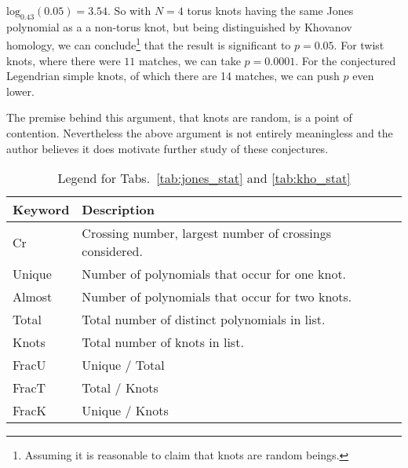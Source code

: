     $\textrm{log}_{0.43}(0.05)=3.54$. So with $N=4$ torus knots having the
    same Jones polynomial as a a non-torus knot, but being distinguished by
    Khovanov homology, we can conclude\footnote{%
        Assuming it is reasonable to claim that knots are random beings.
    }
    that the result is significant to $p=0.05$. For twist knots, where there
    were $11$ matches, we can take $p=0.0001$. For the conjectured Legendrian
    simple knots, of which there are 14 matches, we can push $p$ even lower.
    \par\hfill\par
    The premise behind this argument, that knots are random, is a point of
    contention. Nevertheless the above argument is not entirely meaningless
    and the author believes it does motivate further study of these conjectures.
    \begin{table}
        \centering
        \begin{tabular}{| l | l |}
            \hline
            Keyword & Description\\
            \hline
            Cr     & Crossing number, largest number of crossings considered.\\
            Unique & Number of polynomials that occur for one knot.\\
            Almost & Number of polynomials that occur for two knots.\\
            Total  & Total number of distinct polynomials in list.\\
            Knots  & Total number of knots in list.\\
            FracU  & Unique / Total\\
            FracT  & Total / Knots\\
            FracK  & Unique / Knots\\
            \hline
        \end{tabular}
        \caption{Legend for Tabs.~\ref{tab:jones_stat} and \ref{tab:kho_stat}}
        \label{tab:key}
    \end{table}
